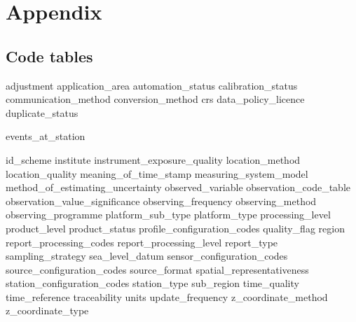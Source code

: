 \documentclass[a4paper]{article}
\begin{document}
\section {Appendix}

\subsection {Code tables}

 {adjustment}
 {application_area}
 {automation_status}
 {calibration_status}
 {communication_method}
 {conversion_method}
 {crs}
 {data_policy_licence}
 {duplicate_status}

 {events_at_station}

 {id_scheme}
 {institute}
 {instrument_exposure_quality}
 {location_method}
 {location_quality}
 {meaning_of_time_stamp}
 {measuring_system_model}
 {method_of_estimating_uncertainty}
 {observed_variable}
 {observation_code_table}
 {observation_value_significance}
 {observing_frequency}
 {observing_method}
 {observing_programme}
 {platform_sub_type}
 {platform_type}
 {processing_level}
 {product_level}
 {product_status}
 {profile_configuration_codes}
 {quality_flag}
 {region}
 {report_processing_codes}
 {report_processing_level}
 {report_type}
 {sampling_strategy}
 {sea_level_datum}
 {sensor_configuration_codes}
 {source_configuration_codes}
 {source_format}
 {spatial_representativeness}
 {station_configuration_codes}
 {station_type}
 {sub_region}
 {time_quality}
 {time_reference}
 {traceability}
 {units}
 {update_frequency}
 {z_coordinate_method}
 {z_coordinate_type}

\end{document}
